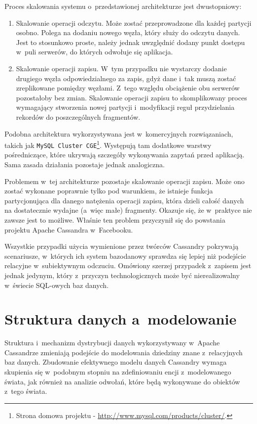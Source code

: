Proces skalowania systemu o~przedstawionej architekturze jest dwustopniowy:

\begin{enumerate}
	\item Skalowanie operacji odczytu. Może zostać przeprowadzone dla każdej partycji osobno. Polega na dodaniu nowego węzła, który służy do odczytu danych. Jest to stosunkowo proste, należy jednak uwzględnić dodany punkt dostępu w~puli serwerów, do których odwołuje się aplikacja.
	\item Skalowanie operacji zapisu. W~tym przypadku nie wystarczy dodanie drugiego węzła odpowiedzialnego za zapis, gdyż dane i~tak muszą zostać zreplikowane pomiędzy węzłami. Z~tego względu obciążenie obu serwerów pozostałoby bez zmian. Skalowanie operacji zapisu to skomplikowany proces wymagający stworzenia nowej partycji i~modyfikacji reguł przydzielania rekordów do poszczególnych fragmentów. 
\end{enumerate}

Podobna architektura wykorzystywana jest w~komercyjnych rozwiązaniach, takich jak \verb+MySQL Cluster CGE+\footnote{Strona domowa projektu - \url{http://www.mysql.com/products/cluster/}.}. Występują tam dodatkowe warstwy pośredniczące, które ukrywają szczegóły wykonywania zapytań przed aplikacją. Sama zasada działania pozostaje jednak analogiczna.

Problemem w~tej architekturze pozostaje skalowanie operacji zapisu. Może ono zostać wykonane poprawnie tylko pod warunkiem, że istnieje funkcja partycjonująca dla danego natężenia operacji zapisu, która dzieli całość danych na dostatecznie wydajne (a~więc małe) fragmenty. Okazuje się, że w~praktyce nie zawsze jest to możliwe. Właśnie ten problem przyczynił się do powstania projektu Apache Cassandra w~Facebooku. 

Wszystkie przypadki użycia wymienione przez twórców Cassandry pokrywają scenariusze, w~których ich system bazodanowy sprawdza się lepiej niż podejście relacyjne w~subiektywnym odczuciu. Omówiony szerzej przypadek z~zapisem jest jednak jedynym, który z~przyczyn technologicznych może być nierealizowalny w~świecie SQL-owych baz danych.

\section{Struktura danych a~modelowanie}
\label{sec:relative_vs_cassandra_model}

Struktura i~mechanizm dystrybucji danych wykorzystywany w~Apache Cassandrze zmieniają podejście do modelowania dziedziny znane z~relacyjnych baz danych. Zbudowanie efektywnego modelu danych Cassandry wymaga skupienia się w~podobnym stopniu na zdefiniowaniu encji z~modelowanego świata, jak również na analizie odwołań, które będą wykonywane do obiektów z~tego świata.~\cite{modeling_best_practices_pt_1}

